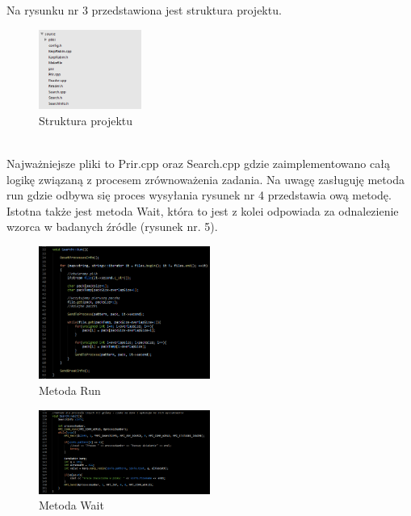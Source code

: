 \documentclass[12pt,a4paper]{article}
\begin{document}
Na rysunku nr 3 przedstawiona jest struktura projektu.
\begin{figure}
  \vspace{-10pt}
  \begin{center}
  \includegraphics[width=0.3\textwidth]{dane/struktura_projektu.png}
  \end{center}
  \vspace{-20pt}
  \caption{Struktura projektu}
  \vspace{30pt}
\end{figure}
\\
Najważniejsze pliki to Prir.cpp oraz Search.cpp gdzie zaimplementowano całą logikę związaną z procesem zrównoważenia zadania. Na uwagę zasługuję metoda run gdzie odbywa się proces wysyłania rysunek nr 4 przedstawia ową metodę. Istotna także jest metoda Wait, która to jest z kolei odpowiada za odnalezienie wzorca w badanych źródle (rysunek nr. 5).
\\

\begin{figure}
  \vspace{-10pt}
  \begin{center}
  \includegraphics[width=0.5\textwidth]{dane/metoda_run.png}
  \end{center}
  \vspace{-20pt}
  \caption{Metoda Run}
  \vspace{30pt}
\end{figure}

\begin{figure}
  \vspace{-10pt}
  \begin{center}
  \includegraphics[width=0.5\textwidth]{dane/metoda_wait.png}
  \end{center}
  \vspace{-20pt}
  \caption{Metoda Wait}
  \vspace{30pt}
\end{figure}
\end{document}
